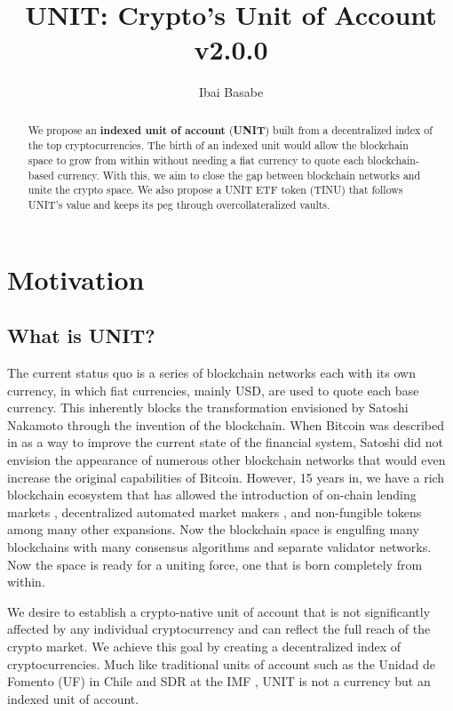 \documentclass[12pt]{article}
\title{UNIT: Crypto's Unit of Account v2.0.0}
\author{Ibai Basabe}
\begin{document}
\date{}

\maketitle


\begin{abstract}
We propose an {\bf indexed unit of account} ({\bf UNIT}) built from a decentralized index of the top cryptocurrencies. The birth of an indexed unit would allow the blockchain space to grow from within without needing a fiat currency to quote each blockchain-based currency. With this, we aim to close the gap between blockchain networks and unite the crypto space.  We also propose a UNIT ETF token (TINU) that follows UNIT's value and keeps its peg through overcollateralized vaults. 
\end{abstract}


\tableofcontents
\newpage

\section{Motivation}

\subsection{What is UNIT?}

The current status quo is a series of blockchain networks each with its own currency, in which fiat currencies, mainly USD, are used to quote each base currency. This inherently blocks the transformation envisioned by Satoshi Nakamoto through the invention of the blockchain. When Bitcoin was described in \cite{nakamoto2008bitcoin} as a way to improve the current state of the financial system, Satoshi did not envision the appearance of numerous other blockchain networks that would even increase the original capabilities of Bitcoin. However, 15 years in, we have a rich blockchain ecosystem that has allowed the introduction of on-chain lending markets \cite{compound2019whitepaper} \cite{aave2020whitepaper}, decentralized automated market makers \cite{uniswap2020whitepaper}, and non-fungible tokens \cite{eip721} among many other expansions. Now the blockchain space is engulfing many blockchains with many consensus algorithms and separate validator networks. Now the space is ready for a uniting force, one that is born completely from within.

We desire to establish a crypto-native unit of account that is not significantly affected by any individual cryptocurrency and can reflect the full reach of the crypto market. We achieve this goal by creating a decentralized index of cryptocurrencies. Much like traditional units of account such as the Unidad de Fomento (UF) in Chile \cite{uf2020methodology} and SDR at the IMF \cite{imf2023sdr}, UNIT is not a currency but an indexed unit of account. 
\end{document}
